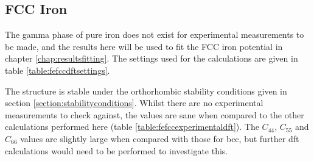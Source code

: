 \FloatBarrier
\subsection{FCC Iron}
\label{section:fccferesults}

The gamma phase of pure iron does not exist for experimental measurements to be made, and the results here will be used to fit the FCC iron potential in chapter \ref{chap:resultsfitting}.  The settings used for the calculations are given in table \ref{table:fefccdftsettings}. 

The structure is stable under the orthorhombic stability conditions given in section \ref{section:stabilityconditions}.  Whilst there are no experimental measurements to check against, the values are sane when compared to the other calculations performed here (table \ref{table:fefccexperimentaldft}).  The $C_{44}$, $C_{55}$ and $C_{66}$ values are slightly large when compared with those for \acrshort{bcc}, but further \acrshort{dft} calculations would need to be performed to investigate this.  

